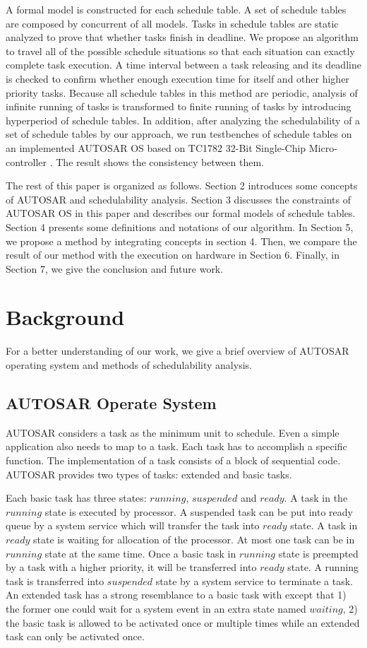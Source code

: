 \documentclass[conference]{IEEEtran}
\begin{document}
A formal model is constructed for each schedule table. A set of schedule tables are composed by concurrent of all models. Tasks in schedule tables are static analyzed to prove that whether tasks finish in deadline. We propose an algorithm to travel all of the possible schedule situations so that each situation can exactly complete task execution. A time interval between a task releasing and its deadline is checked to confirm whether enough execution time for itself and other higher priority tasks. Because all schedule tables in this method are periodic, analysis of infinite running of tasks is transformed to finite running of tasks by introducing hyperperiod of schedule tables. In addition, after analyzing the schedulability of a set of schedule tables by our approach, we run testbenches of schedule tables on an implemented AUTOSAR OS based on TC1782 32-Bit Single-Chip Micro-controller \cite{infineon.org}. The result shows the consistency between them.


The rest of this paper is organized as follows. Section 2 introduces some concepts of AUTOSAR and schedulability analysis. Section 3 discusses the constraints of AUTOSAR OS in this paper and describes our formal models of schedule tables. Section 4 presents some definitions and notations of our algorithm. In Section 5, we propose a method by integrating concepts in section 4. Then, we compare the result of our method with the execution on hardware in Section 6. Finally, in Section 7, we give the conclusion and future work.

\section{Background}
For a better understanding of our work, we give a brief overview of AUTOSAR operating system and methods of schedulability analysis.
\subsection{AUTOSAR Operate System}

AUTOSAR considers a task as the minimum unit to schedule. Even a simple application also needs to map to a task. Each task has to accomplish a specific function. The implementation of a task consists of a block of sequential code. AUTOSAR provides two types of tasks: extended and basic tasks.

Each basic task has three states: $running$, $suspended$ and $ready$. A task in the $running$ state is executed by processor. A suspended task can be put into ready queue by a system service which will transfer the task into $ready$ state. A task in $ready$ state is waiting for allocation of the processor. At most one task can be in $running$ state at the same time. Once a basic task in $running$ state is preempted by a task with a higher priority, it will be transferred into $ready$ state. A running task is transferred into $suspended$ state by a system service to terminate a task. An extended task has a strong resemblance to a basic task with except that 1) the former one could wait for a system event in an extra state named $waiting$, 2) the basic task is allowed to be activated once or multiple times while an extended task can only be activated once. 
\end{document}
